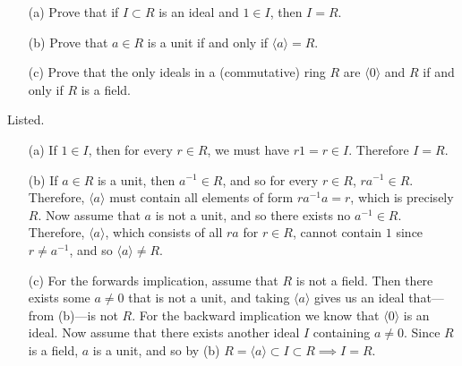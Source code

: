  \begin{exercise}[Shifrin 4.1.3]
    \begin{enumerate}
      \item[(a)] Prove that if $I \subset R$ is an ideal and $1 \in I$, then $I = R$.
      \item[(b)] Prove that $a \in R$ is a unit if and only if $\langle a \rangle = R$.
      \item[(c)] Prove that the only ideals in a (commutative) ring $R$ are $\langle 0 \rangle$ and $R$ if and only if $R$ is a field.
    \end{enumerate}
  \end{exercise}
  \begin{solution}
    Listed. 
    \begin{enumerate}
      \item[(a)] If $1 \in I$, then for every $r \in R$, we must have $r1 = r \in I$. Therefore $I = R$. 
      \item[(b)] If $a \in R$ is a unit, then $a^{-1} \in R$, and so for every $r \in R$, $r a^{-1} \in R$. Therefore, $\langle a \rangle$ must contain all elements of form $ra^{-1} a = r$, which is precisely $R$. Now assume that $a$ is not a unit, and so there exists no $a^{-1} \in R$. Therefore, $\langle a \rangle$, which consists of all $ra$ for $r \in R$, cannot contain $1$ since $r \neq a^{-1}$, and so $\langle a \rangle \neq R$. 
      \item[(c)] For the forwards implication, assume that $R$ is not a field. Then there exists some $a \neq 0$ that is not a unit, and taking $\langle a \rangle$ gives us an ideal that---from (b)---is not $R$. For the backward implication we know that $\langle 0 \rangle$ is an ideal. Now assume that there exists another ideal $I$ containing $a \neq 0$. Since $R$ is a field, $a$ is a unit, and so by (b) $R = \langle a \rangle \subset I \subset R \implies I = R$. 
    \end{enumerate}
  \end{solution}

